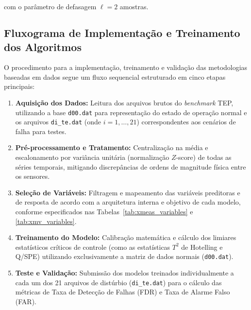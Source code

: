 \documentclass[journal]{IEEEtran}
\begin{document}
com o parâmetro de defasagem $\ell = 2$ amostras.

\subsection{Fluxograma de Implementação e Treinamento dos Algoritmos}
\label{subsec:fluxograma}

O procedimento para a implementação, treinamento e validação das metodologias baseadas em dados segue um fluxo sequencial estruturado em cinco etapas principais:

\begin{enumerate}
    \item \textbf{Aquisição dos Dados:} Leitura dos arquivos brutos do \textit{benchmark} TEP, utilizando a base \texttt{d00.dat} para representação do estado de operação normal e os arquivos \texttt{d{i}\_te.dat} (onde $i = 1, \dots, 21$) correspondentes aos cenários de falha para testes.
    \item \textbf{Pré-processamento e Tratamento:} Centralização na média e escalonamento por variância unitária (normalização $Z$-score) de todas as séries temporais, mitigando discrepâncias de ordens de magnitude física entre os sensores.
    \item \textbf{Seleção de Variáveis:} Filtragem e mapeamento das variáveis preditoras e de resposta de acordo com a arquitetura interna e objetivo de cada modelo, conforme especificados nas Tabelas~\ref{tab:xmeas_variables} e \ref{tab:xmv_variables}.
    \item \textbf{Treinamento do Modelo:} Calibração matemática e cálculo dos limiares estatísticos críticos de controle (como as estatísticas $T^2$ de Hotelling e Q/SPE) utilizando exclusivamente a matriz de dados normais (\texttt{d00.dat}).
    \item \textbf{Teste e Validação:} Submissão dos modelos treinados individualmente a cada um dos 21 arquivos de distúrbio (\texttt{d{i}\_te.dat}) para o cálculo das métricas de Taxa de Detecção de Falhas (FDR) e Taxa de Alarme Falso (FAR).
\end{enumerate}
\end{document}
